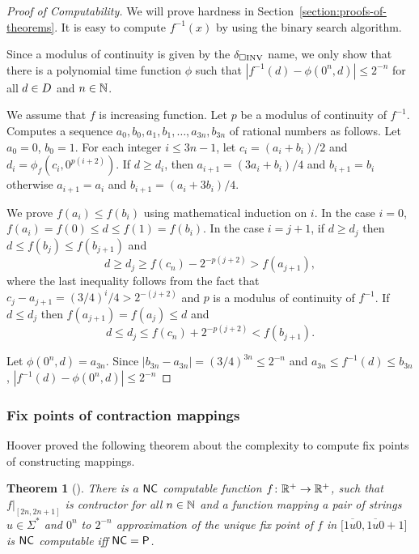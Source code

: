 \documentclass{article}
\newtheorem{theorem}{Theorem}[section]
\theoremstyle{definition}
\theoremstyle{remark}
\begin{document}
\begin{proof}[Proof of Computability]
We will prove hardness in Section~\ref{section:proofs-of-theorems}.
It is easy to compute $f^{-1}(x)$ by using the binary search algorithm.

Since a modulus of continuity is given by the $\delta _{\square \mathrm{INV}}$ name,
we only show that there is a polynomial time function $\phi$ such that 
$|f^{-1}(d) - \phi(0^n, d)| \le 2^{-n}$ for all $d \in D$ and $n \in \mathbb N$.

We assume that $f$ is increasing function.
Let $p$ be a modulus of continuity of $f^{-1}$.
Computes a sequence  $a_0, b_0, a_1,b_1, \dots, a_{3n}, b_{3n}$ of rational numbers as follows.
Let $a_0 = 0$, $b_0 = 1$.
For each integer $i \le 3n-1$,
let $c_i = (a_i+b_i)/2$ and $d_i = \phi_f(c_i, 0^{p(i+2)})$.
If $d \ge d_i$, then $a_{i+1} = (3a_i+b_i)/4$ and $b_{i+1} = b_i$
otherwise $a_{i+1} = a_i$ and $b_{i+1} = (a_i+3b_i)/4$.

We prove $f(a_i) \le f(b_i)$ using mathematical induction on $i$.
In the case $i = 0$, $f(a_i) = f(0) \le d \le f(1) = f(b_i)$.
In the case $i=j+1$, if $d \ge d_j$ then $d \le f(b_j) \le f(b_{j+1})$ and
\begin{equation}
 d \ge d_j \ge f(c_n) - 2^{-p(j+2)} > f(a_{j+1}),
\end{equation}
where the last inequality follows from the fact that $c_j - a_{j+1} = (3/4)^i/4 > 2^{-(j+2)}$ and $p$ is a modulus of continuity of $f^{-1}$.
If $d \le d_j$ then $f(a_{j+1}) = f(a_j) \le d$ and 
\begin{equation}
 d \le d_j \le f(c_n) + 2^{-p(j+2)} < f(b_{j+1}).
\end{equation}

Let $\phi(0^n, d) = a_{3n}$.
Since $|b_{3n} - a_{3n}| = (3/4)^{3n} \le 2^{-n}$ and
$a_{3n} \le f^{-1}(d) \le b_{3n}$,
$|f^{-1}(d) - \phi(0^n, d)| \le 2^{-n}$
\end{proof}

\subsubsection{Fix points of contraction mappings}

Hoover proved the following theorem about the complexity to compute fix points
of constructing mappings.

\begin{theorem}
[{\cite[Theorem 4.5]{hoover1991real}}]
\label{theorem:hoover1991-4.5}
 There is a $\mathsf{NC}$ computable function $f \colon \mathbb R^+ \to \mathbb R^+$,
 such that $f|_{[2n, 2n+1]}$ is contractor for all $n \in \mathbb N$ and
 a function mapping a pair of strings $u \in \Sigma^*$ and $0^n$
 to $2^{-n}$ approximation of the unique fix point of $f$
 in $\bigl[ \overline{1u0}, \overline{1u0}+1 \bigr]$ is $\mathsf{NC}$ computable
 iff $\mathsf{NC} = \mathsf{P}$.
\end{theorem}
\end{document}

